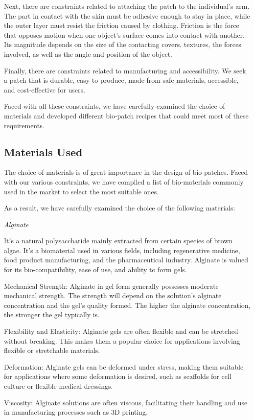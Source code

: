 Next, there are constraints related to attaching the patch to the individual's arm. The part in contact with the skin must be adhesive enough to stay in place, while the outer layer must resist the friction caused by clothing. Friction is the force that opposes motion when one object's surface comes into contact with another. Its magnitude depends on the size of the contacting covers, textures, the forces involved, as well as the angle and position of the object.

Finally, there are constraints related to manufacturing and accessibility. We seek a patch that is durable, easy to produce, made from safe materials, accessible, and cost-effective for users.

Faced with all these constraints, we have carefully examined the choice of materials and developed different bio-patch recipes that could meet most of these requirements.

\subsection{Materials Used}
The choice of materials is of great importance in the design of bio-patches. Faced with our various constraints, we have compiled a list of bio-materials commonly used in the market to select the most suitable ones.

As a result, we have carefully examined the choice of the following materials:

\textit{Alginate}

It's a natural polysaccharide mainly extracted from certain species of brown algae. It’s a biomaterial used in various fields, including regenerative medicine, food product manufacturing, and the pharmaceutical industry. Alginate is valued for its bio-compatibility, ease of use, and ability to form gels.
\item Mechanical Strength: Alginate in gel form generally possesses moderate mechanical strength. The strength will depend on the solution's alginate concentration and the gel's quality formed. The higher the alginate concentration, the stronger the gel typically is.
\item Flexibility and Elasticity: Alginate gels are often flexible and can be stretched without breaking. This makes them a popular choice for applications involving flexible or stretchable materials.
\item Deformation: Alginate gels can be deformed under stress, making them suitable for applications where some deformation is desired, such as scaffolds for cell culture or flexible medical dressings.
\item Viscosity: Alginate solutions are often viscous, facilitating their handling and use in manufacturing processes such as 3D printing.

